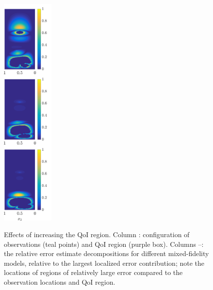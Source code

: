 \documentclass[review,sort&compress]{elsarticle}
\begin{document}
\begin{figure}[htbp]
{  \includegraphics[width=0.23\textwidth]{vs_qoi/vs_qoi_err2_barnorm.png}
  \label{subfig:obsMFlast}
}
  \caption{Effects of increasing the QoI region. Column \protect{}: configuration of observations (teal points) and QoI region (purple box). Columns \protect{}--\protect{}: the relative error estimate decompositions for different mixed-fidelity models, relative to the largest localized error contribution; note the locations of regions of relatively large error compared to the observation locations and QoI region.}
  \label{fig:qoiStudy}
\end{figure}
\end{document}
